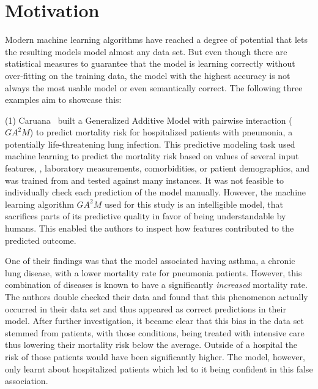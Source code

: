 \section{Motivation}
\label{sec:motivation_intro}
Modern machine learning algorithms have reached a degree of potential that lets the resulting models model almost any data set.
But even though there are statistical measures to guarantee that the model is learning correctly without over-fitting on the training data, the model with the highest accuracy is not always the most usable model or even semantically correct.
The following three examples aim to showcase this:

\par \noindent (1)
Caruana~\etal\cite{Caruana:2015:IMH:2783258.2788613} built a Generalized Additive Model with pairwise interaction ($GA^2M$) to predict mortality risk for hospitalized patients with pneumonia, a potentially life-threatening lung infection. This predictive modeling task used machine learning to predict the mortality risk based on values of several input features, \eg, laboratory measurements, comorbidities, or patient demographics, and was trained from and tested against many instances. It was not feasible to individually check each prediction of the model manually. However, the machine learning algorithm $GA^2M$ used for this study is an intelligible model, that sacrifices parts of its predictive quality in favor of being understandable by humans. This enabled the authors to inspect how features contributed to the predicted outcome.

One of their findings was that the model associated having asthma, a chronic lung disease, with a lower mortality rate for pneumonia patients. However, this combination of diseases is known to have a significantly \emph{increased} mortality rate.
The authors double checked their data and found that this phenomenon actually occurred in their data set and thus appeared as correct predictions in their model. After further investigation, it became clear that this bias in the data set stemmed from patients, with those conditions, being treated with intensive care thus lowering their mortality risk below the average. Outside of a hospital the risk of those patients would have been significantly higher. The model, however, only learnt about hospitalized patients which led to it being confident in this false association.

